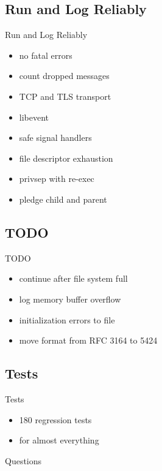 \documentclass[14pt]{beamer}
\begin{document}
\subsection{Run and Log Reliably}
\begin{frame}{Run and Log Reliably}
\begin{itemize}
    \item no fatal errors
    \item count dropped messages
    \item TCP and TLS transport
    \item libevent
    \item safe signal handlers
    \item file descriptor exhaustion
    \item privsep with re-exec
    \item pledge child and parent
\end{itemize}
\end{frame}

\subsection{TODO}
\begin{frame}{TODO}
\begin{itemize}
    \item continue after file system full
    \item log memory buffer overflow
    \item initialization errors to file
    \item move format from RFC 3164 to 5424
\end{itemize}
\end{frame}

\subsection{Tests}
\begin{frame}{Tests}
\begin{itemize}
    \item 180 regression tests
    \item for almost everything
\end{itemize}
\end{frame}

\begin{frame}{Questions}
\begin{center}
\end{center}
\end{frame}
\end{document}
